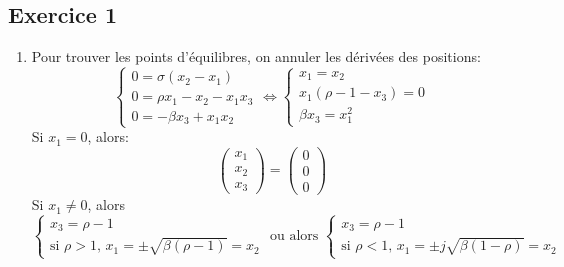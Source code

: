 \documentclass{../../td}
\begin{document}
\subsection*{Exercice 1}
\begin{enumerate}
\item Pour trouver les points d'équilibres, on annuler les dérivées des positions:
\[
\left \{ \begin{matrix}
0 = \sigma(x_2-x_1)\\
0 = \rho x_1 - x_2-x_1x_3\\
0 = -\beta x_3 + x_1 x_2
\end{matrix} \right. \Leftrightarrow
\left \{ \begin{matrix}
x_1 = x_2\\
x_1(\rho -1 -x_3) = 0 \\
\beta x_3 = x_1^2
\end{matrix} \right.\]
Si $ x_1 = 0$, alors:
\[\begin{pmatrix}x_1\\x_2\\x_3\end{pmatrix} = \begin{pmatrix}0\\0\\0\end{pmatrix}\]
Si $x_1 \neq 0$, alors 
\[\left \{ \begin{matrix}
x_3 = \rho -1\\
\text{si $\rho > 1$, } x_1 = \pm \sqrt{\beta(\rho -1)} = x_2
\end{matrix}\right.
\text{	ou alors	}
\left \{ \begin{matrix}
x_3 = \rho -1\\
\text{si $\rho < 1$, } x_1 = \pm j\sqrt{\beta(1-\rho)} = x_2
\end{matrix}\right.\]



\end{enumerate}
\end{document}
